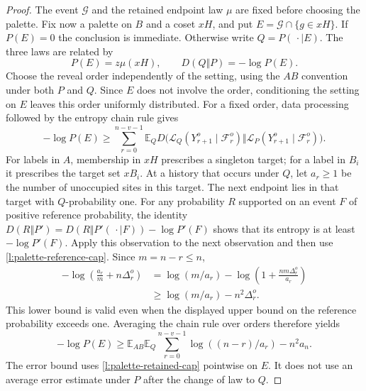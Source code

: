 \begin{proof}
The event $\mathcal G$ and the retained endpoint law $\mu$ are fixed
before choosing the palette. Fix now a palette on $B$ and a coset $xH$,
and put $E=\mathcal G\cap\{g\in xH\}$. If $P(E)=0$ the conclusion
is immediate. Otherwise write $Q=P(\,\cdot\mid E)$. The three laws
are related by
\[
 P(E)=z\mu(xH),\qquad
 D(Q\Vert P)=-\log P(E).
\]
Choose the reveal order independently of the setting, using the $AB$
convention under both $P$ and $Q$. Since $E$ does not involve the order,
conditioning the setting on $E$ leaves this order uniformly distributed.
For a fixed order, data processing followed by the entropy chain rule
gives
\[
 -\log P(E)\ge
 \sum_{r=0}^{n-v-1}\mathbb E_Q
 D\bigl(\mathcal L_Q(Y_{r+1}^o\mid\mathcal F_r^o)
    \Vert\mathcal L_P(Y_{r+1}^o\mid\mathcal F_r^o)\bigr).
\]
For labels in $A$, membership in $xH$ prescribes a singleton target;
for a label in $B_i$ it prescribes the target set $xB_i$.
At a history that occurs under $Q$, let $a_r\ge1$ be the number of
unoccupied sites in this target.  The next endpoint lies in that target
with $Q$-probability one.  For any probability $R$ supported on an event
$F$ of positive reference probability, the identity
$D(R\Vert P')=D(R\Vert P'(\,\cdot\mid F))-\log P'(F)$
shows that its entropy is at least $-\log P'(F)$.
Apply this observation to the next observation and then use
\eqref{l:palette-reference-cap}.  Since $m=n-r\le n$,
\[
 \begin{split}
 -\log\left(\frac{a_r}{m}+n\Delta_r^o\right)
 &=\log(m/a_r)-\log\left(1+\frac{nm\Delta_r^o}{a_r}\right)\\
 &\ge\log(m/a_r)-n^2\Delta_r^o.
 \end{split}
\]
This lower bound is valid even when the displayed upper bound on the
reference probability exceeds one.  Averaging the chain rule over orders
therefore yields
\begin{equation}
 -\log P(E)\ge
 \mathbb E_{AB}\mathbb E_Q
       \sum_{r=0}^{n-v-1}\log((n-r)/a_r)-n^2a_n.
 \label{l:palette-rare-chain}
\end{equation}
The error bound uses \eqref{l:palette-retained-cap} pointwise on $E$.
It does not use an average error estimate under $P$ after the change
of law to $Q$.


\end{proof}
